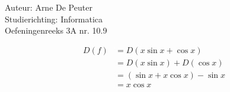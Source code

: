 \documentclass[a4paper]{article}
\begin{document}
\noindent \large Auteur: Arne De Peuter\\
\noindent \large Studierichting: Informatica\\
\noindent \large Oefeningenreeks 3A nr. 10.9\\

\medskip

\normalsize

\[
\begin{aligned}
D(f) &= D(x\sin x + \cos x) \\
     &= D(x\sin x) + D(\cos x) \\
     &= (\sin x + x \cos x) - \sin x \\
     &= x \cos x
\end{aligned}
\]

\end{document}
